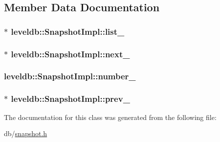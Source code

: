 \subsection{Member Data Documentation}
\hypertarget{classleveldb_1_1_snapshot_impl_ac2b7d24074cfe0dcdce4be956016a5d1}{
\subsubsection[{list\-\_\-}]{$\ast$ leveldb\-::\-Snapshot\-Impl\-::list\-\_\-\hspace{0.3cm}{\ttfamily [private]}}}\label{classleveldb_1_1_snapshot_impl_ac2b7d24074cfe0dcdce4be956016a5d1}
\hypertarget{classleveldb_1_1_snapshot_impl_a4cd084fe53c616fca125a50cf6f64cb2}{
\subsubsection[{next\-\_\-}]{$\ast$ leveldb\-::\-Snapshot\-Impl\-::next\-\_\-\hspace{0.3cm}{\ttfamily [private]}}}\label{classleveldb_1_1_snapshot_impl_a4cd084fe53c616fca125a50cf6f64cb2}
\hypertarget{classleveldb_1_1_snapshot_impl_aa31dca969679d05d17c4c0eb1443a96e}{
\subsubsection[{number\-\_\-}]{ leveldb\-::\-Snapshot\-Impl\-::number\-\_\-}}\label{classleveldb_1_1_snapshot_impl_aa31dca969679d05d17c4c0eb1443a96e}
\hypertarget{classleveldb_1_1_snapshot_impl_a562cbefac390343cf1d8cd543b9a7d32}{
\subsubsection[{prev\-\_\-}]{$\ast$ leveldb\-::\-Snapshot\-Impl\-::prev\-\_\-\hspace{0.3cm}{\ttfamily [private]}}}\label{classleveldb_1_1_snapshot_impl_a562cbefac390343cf1d8cd543b9a7d32}


The documentation for this class was generated from the following file\-:\begin{DoxyCompactItemize}
\item 
db/\hyperlink{snapshot_8h}{snapshot.\-h}\end{DoxyCompactItemize}
